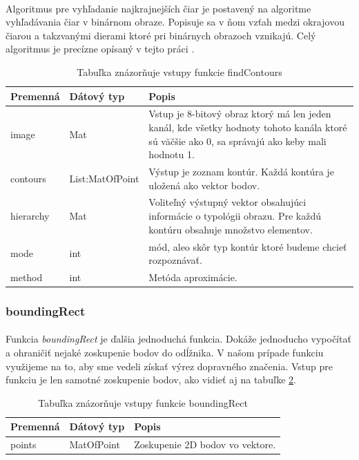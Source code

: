 \documentclass[12pt]{article}
\begin{document}
\paragraph{}
Algoritmus pre vyhľadanie najkrajnejších čiar je postavený na algoritme vyhľadávania čiar v binárnom obraze. Popisuje sa v ňom vzťah medzi okrajovou čiarou a takzvanými dierami ktoré pri binárnych obrazoch vznikajú. Celý algoritmus je precízne opísaný v tejto práci
\cite{suzuky}.
\begin{table}
	\centering
    \begin{tabular}{ | l | l | p{5cm} |}
    \hline
    Premenná & Dátový typ & Popis \\ \hline
    image & Mat & Vstup je 8-bitový obraz ktorý má len jeden kanál, kde všetky hodnoty tohoto kanála ktoré sú väčšie ako 0, sa správajú ako keby mali hodnotu 1. \\ \hline
    contours & List:MatOfPoint & Výstup je zoznam kontúr. Každá kontúra je uložená ako vektor bodov. \\ \hline
    hierarchy & Mat & Voliteľný výstupný vektor obsahujúci informácie o typológii obrazu. Pre každú kontúru obsahuje množstvo elementov. \\ \hline
    mode & int & mód, aleo skôr typ kontúr ktoré budeme chcieť rozpoznávať. \\ \hline
    method & int & Metóda aproximácie. \\
    \hline
    \end{tabular}
  	\caption{Tabuľka znázorňuje vstupy funkcie findContours}
  	\label{findContoursPar}
\end{table}
\subsubsection{boundingRect}
\paragraph{}
Funkcia \emph{boundingRect} je ďalšia jednoduchá funkcia. Dokáže jednoducho vypočítať a ohraničiť nejaké zoskupenie bodov do odĺžnika.
V našom prípade funkciu využijeme na to, aby sme vedeli získať výrez dopravného značenia. Vstup pre funkciu je len samotné zoskupenie bodov, ako vidieť aj na tabuľke \ref{boundingRectPar}.
\cite{OpenCVDoc}
\begin{table}
	\centering
    \begin{tabular}{ | l | l | p{5cm} |}
    \hline
    Premenná & Dátový typ & Popis \\ \hline
    points & MatOfPoint & Zoskupenie 2D bodov vo vektore. \\ 
    \hline
    \end{tabular}
  	\caption{Tabuľka znázorňuje vstupy funkcie boundingRect}
  	\label{boundingRectPar}
\end{table}
\end{document}
